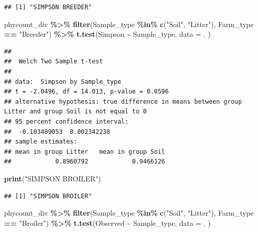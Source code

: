\documentclass[
]{article}
\newenvironment{Shaded}{\begin{snugshade}}{\end{snugshade}}
\newcommand{\AttributeTok}[1]{\textcolor[rgb]{0.13,0.29,0.53}{#1}}
\newcommand{\FunctionTok}[1]{\textcolor[rgb]{0.13,0.29,0.53}{\textbf{#1}}}
\newcommand{\NormalTok}[1]{#1}
\newcommand{\SpecialCharTok}[1]{\textcolor[rgb]{0.81,0.36,0.00}{\textbf{#1}}}
\newcommand{\StringTok}[1]{\textcolor[rgb]{0.31,0.60,0.02}{#1}}
\begin{document}
\begin{verbatim}
## [1] "SIMPSON BREEDER"
\end{verbatim}

\begin{Shaded}
\begin{Highlighting}[]
\NormalTok{phycount\_div }\SpecialCharTok{\%\textgreater{}\%}
  \FunctionTok{filter}\NormalTok{(Sample\_type }\SpecialCharTok{\%in\%} \FunctionTok{c}\NormalTok{(}\StringTok{"Soil"}\NormalTok{, }\StringTok{"Litter"}\NormalTok{),}
\NormalTok{         Farm\_type }\SpecialCharTok{==} \StringTok{"Breeder"}\NormalTok{) }\SpecialCharTok{\%\textgreater{}\%}
  \FunctionTok{t.test}\NormalTok{(Simpson }\SpecialCharTok{\textasciitilde{}}\NormalTok{ Sample\_type, }
       \AttributeTok{data =}\NormalTok{ .}
\NormalTok{       )}
\end{Highlighting}
\end{Shaded}

\begin{verbatim}
## 
##  Welch Two Sample t-test
## 
## data:  Simpson by Sample_type
## t = -2.0496, df = 14.013, p-value = 0.0596
## alternative hypothesis: true difference in means between group Litter and group Soil is not equal to 0
## 95 percent confidence interval:
##  -0.103409053  0.002342238
## sample estimates:
## mean in group Litter   mean in group Soil 
##            0.8960792            0.9466126
\end{verbatim}

\begin{Shaded}
\begin{Highlighting}[]
\FunctionTok{print}\NormalTok{(}\StringTok{"SIMPSON BROILER"}\NormalTok{)}
\end{Highlighting}
\end{Shaded}

\begin{verbatim}
## [1] "SIMPSON BROILER"
\end{verbatim}

\begin{Shaded}
\begin{Highlighting}[]
\NormalTok{phycount\_div }\SpecialCharTok{\%\textgreater{}\%}
  \FunctionTok{filter}\NormalTok{(Sample\_type }\SpecialCharTok{\%in\%} \FunctionTok{c}\NormalTok{(}\StringTok{"Soil"}\NormalTok{, }\StringTok{"Litter"}\NormalTok{),}
\NormalTok{         Farm\_type }\SpecialCharTok{==} \StringTok{"Broiler"}\NormalTok{) }\SpecialCharTok{\%\textgreater{}\%}
  \FunctionTok{t.test}\NormalTok{(Observed }\SpecialCharTok{\textasciitilde{}}\NormalTok{ Sample\_type, }
       \AttributeTok{data =}\NormalTok{ .}
\NormalTok{       )}
\end{Highlighting}
\end{Shaded}
\end{document}
